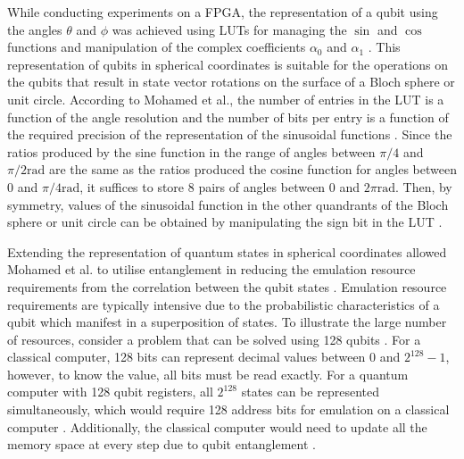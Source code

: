 While conducting experiments on a FPGA, the representation of a qubit using the angles $\theta$ and $\phi$ was achieved using LUTs for managing the $\sin$ and $\cos$ functions and manipulation of the complex coefficients $\alpha_{0}$ and $\alpha_{1}$ \cite{mohamed2009using}. This representation of qubits in spherical coordinates is suitable for the operations on the qubits that result in state vector rotations on the surface of a Bloch sphere or unit circle. According to Mohamed et al., the number of entries in the LUT is a function of the angle resolution and the number of bits per entry is a function of the required precision of the representation of the sinusoidal functions \cite{mohamed2009using}. Since the ratios produced by the sine function in the range of angles between $\pi/4$ and $\pi/2 \si{\radian}$ are the same as the ratios produced the cosine function for angles between $0$ and $\pi/4\si{\radian}$, it suffices to store 8 pairs of angles between $0$ and $2\pi\si{\radian}$. Then, by symmetry, values of the sinusoidal function in the other quandrants of the Bloch sphere or unit circle can be obtained by manipulating the sign bit in the LUT \cite{mohamed2009using}.

Extending the representation of quantum states in spherical coordinates allowed Mohamed et al. to utilise entanglement in reducing the emulation resource requirements from the correlation between the qubit states \cite{mohamed2009using}. Emulation resource requirements are typically intensive due to the probabilistic characteristics of a qubit which manifest in a superposition of states. To illustrate the large number of resources, consider a problem that can be solved using 128 qubits \cite{mohamed2009using}. For a classical computer, 128 bits can represent decimal values between 0 and $2^{128}-1$, however, to know the value, all bits must be read exactly. For a quantum computer with 128 qubit registers, all $2^{128}$ states can be represented simultaneously, which would require 128 address bits for emulation on a classical computer \cite{mohamed2009using}. Additionally, the classical computer would need to update all the memory space at every step due to qubit entanglement \cite{mohamed2009using}. 

